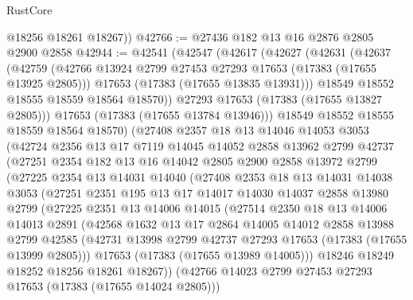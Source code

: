 \begin{lexlean}{RustCore}
\begin{coremodule}
        @18256
        @18261
        @18267))
@42766 := @27436 @182 @13 @16 @2876 @2805 @2900 @2858
@42944 := @42541
    (@42547
      (@42617
        (@42627
          (@42631
            (@42637
              (@42759
                (@42766 @13924 @2799 @27453 @27293 @17653 (@17383 (@17655 @13925 @2805)))
                @17653
                (@17383 (@17655 @13835 @13931)))
              @18549
              @18552
              @18555
              @18559
              @18564
              @18570))
          @27293
          @17653
          (@17383 (@17655 @13827 @2805)))
        @17653
        (@17383 (@17655 @13784 @13946)))
      @18549
      @18552
      @18555
      @18559
      @18564
      @18570)
    (@27408
      @2357
      @18
      @13
      @14046
      @14053
      @3053
      (@42724
        @2356
        @13
        @17
        @7119
        @14045
        @14052
        @2858
        @13962
        @2799
        @42737
        (@27251
          @2354
          @182
          @13
          @16
          @14042
          @2805
          @2900
          @2858
          @13972
          @2799
          (@27225
            @2354
            @13
            @14031
            @14040
            (@27408
              @2353
              @18
              @13
              @14031
              @14038
              @3053
              (@27251
                @2351
                @195
                @13
                @17
                @14017
                @14030
                @14037
                @2858
                @13980
                @2799
                (@27225
                  @2351
                  @13
                  @14006
                  @14015
                  (@27514
                    @2350
                    @18
                    @13
                    @14006
                    @14013
                    @2891
                    (@42568
                      @1632
                      @13
                      @17
                      @2864
                      @14005
                      @14012
                      @2858
                      @13988
                      @2799
                      @42585
                      (@42731 @13998 @2799 @42737 @27293 @17653 (@17383 (@17655 @13999 @2805)))
                      @17653
                      (@17383 (@17655 @13989 @14005)))
                    @18246
                    @18249
                    @18252
                    @18256
                    @18261
                    @18267))
                (@42766 @14023 @2799 @27453 @27293 @17653 (@17383 (@17655 @14024 @2805)))

\end{coremodule}
\end{lexlean}
